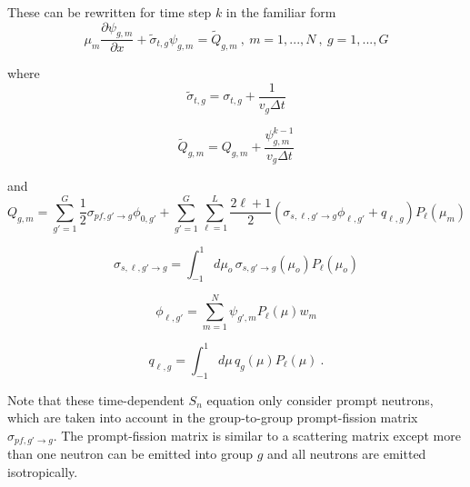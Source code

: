 \documentclass{article}
\begin{document}
These can be rewritten for time step $k$ in the familiar form
\begin{equation}
\label{eq:snmg}
\mu_m \frac{\partial \psi_{g,m}}{\partial x} + \tilde{\sigma}_{t,g} \psi_{g,m}  = \tilde{Q}_{g,m} \:,  \: m=1,...,N \:, \: g=1,...,G 
\end{equation}

where  
\begin{equation*}
\tilde{\sigma}_{t,g} = \sigma_{t,g} + \frac{1}{v_g \Delta t} 
\end{equation*} 

\begin{equation*}
\tilde{Q}_{g,m} = Q_{g,m} + \frac{\psi^{k-1}_{g,m}}{v_g \Delta t}
\end{equation*} 

and
\begin{equation*}
Q_{g,m} = \sum_{g'=1}^G \frac{1}{2} \sigma_{pf,g' \to g} \phi_{0,g'} + \sum_{g'=1}^G \sum_{\ell=1}^L \frac{2 \ell + 1}{2} (\sigma_{s,\ell,g'\to g}\phi_{\ell,g'} + q_{\ell,g}) P_\ell(\mu_m)
\end{equation*}

\begin{equation*}
\sigma_{s,\ell,g'\to g} = \int_{-1}^1 d\mu_o \, \sigma_{s,g' \to g} (\mu_o) P_\ell(\mu_o) 
\end{equation*}

\begin{equation*}
\phi_{\ell,g'} = \sum_{m=1}^N \psi_{g',m} P_\ell(\mu) w_m 
\end{equation*}

\begin{equation*}
q_{\ell,g} = \int_{-1}^1 d\mu \, q_{g} (\mu) P_\ell(\mu) \: .
\end{equation*}

Note that these time-dependent $S_n$ equation only consider prompt neutrons, which are taken into account in the group-to-group prompt-fission matrix $\sigma_{pf,g' \to g}$. The prompt-fission matrix is similar to a scattering matrix except more than one neutron can be emitted into group $g$ and all neutrons are emitted isotropically.
\end{document}
